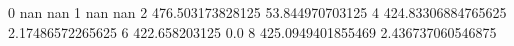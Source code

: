 0 nan nan
1 nan nan
2 476.503173828125 53.844970703125
4 424.83306884765625 2.17486572265625
6 422.658203125 0.0
8 425.0949401855469 2.436737060546875
